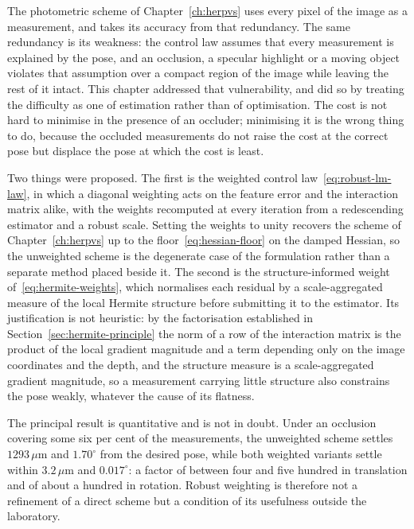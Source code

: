The photometric scheme of Chapter~\ref{ch:herpvs} uses every pixel of the
image as a measurement, and takes its accuracy from that redundancy. The same
redundancy is its weakness: the control law assumes that every measurement is
explained by the pose, and an occlusion, a specular highlight or a moving
object violates that assumption over a compact region of the image while
leaving the rest of it intact. This chapter addressed that vulnerability, and
did so by treating the difficulty as one of estimation rather than of
optimisation. The cost is not hard to minimise in the presence of an occluder;
minimising it is the wrong thing to do, because the occluded measurements do
not raise the cost at the correct pose but displace the pose at which the cost
is least.

Two things were proposed. The first is the weighted control
law~\eqref{eq:robust-lm-law}, in which a diagonal weighting acts on the
feature error and the interaction matrix alike, with the weights recomputed at
every iteration from a redescending estimator and a robust scale. Setting the
weights to unity recovers the scheme of Chapter~\ref{ch:herpvs} up to the
floor~\eqref{eq:hessian-floor} on the damped Hessian, so the unweighted scheme
is the degenerate case of the formulation rather than a separate method placed
beside it. The second is the structure-informed weight
of~\eqref{eq:hermite-weights}, which normalises each residual by a
scale-aggregated measure of the local Hermite structure before submitting it
to the estimator. Its justification is not heuristic: by the factorisation
established in Section~\ref{sec:hermite-principle} the norm of a row of the
interaction matrix is the product of the local gradient magnitude and a term
depending only on the image coordinates and the depth, and the structure
measure is a scale-aggregated gradient magnitude, so a measurement carrying
little structure also constrains the pose weakly, whatever the cause of its
flatness.

The principal result is quantitative and is not in doubt. Under an occlusion
covering some six per cent of the measurements, the unweighted scheme settles
$1293\,\mu\mathrm{m}$ and $1.70^{\circ}$ from the desired pose, while both
weighted variants settle within $3.2\,\mu\mathrm{m}$ and $0.017^{\circ}$: a
factor of between four and five hundred in translation and of about a hundred
in rotation. Robust weighting is therefore not a refinement of a direct scheme
but a condition of its usefulness outside the laboratory.

